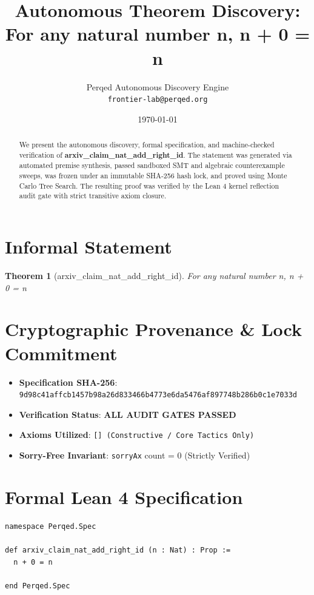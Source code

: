 \documentclass[11pt,a4paper]{article}
\title{\textbf{Autonomous Theorem Discovery: For any natural number n, n + 0 = n}}
\author{Perqed Autonomous Discovery Engine \\ \texttt{frontier-lab@perqed.org}}
\date{\today}
\newtheorem{theorem}{Theorem}
\begin{document}
\maketitle

\begin{abstract}
We present the autonomous discovery, formal specification, and machine-checked verification of \textbf{arxiv_claim_nat_add_right_id}. The statement was generated via automated premise synthesis, passed sandboxed SMT and algebraic counterexample sweeps, was frozen under an immutable SHA-256 hash lock, and proved using Monte Carlo Tree Search. The resulting proof was verified by the Lean 4 kernel reflection audit gate with strict transitive axiom closure.
\end{abstract}

\section{Informal Statement}
\begin{theorem}[arxiv_claim_nat_add_right_id]
For any natural number n, n + 0 = n
\end{theorem}

\section{Cryptographic Provenance \& Lock Commitment}
\begin{itemize}
  \item \textbf{Specification SHA-256}: \texttt{9d98c41affcb1457b98a26d833466b4773e6da5476af897748b286b0c1e7033d}
  \item \textbf{Verification Status}: \textbf{ALL AUDIT GATES PASSED}
  \item \textbf{Axioms Utilized}: \texttt{[] (Constructive / Core Tactics Only)}
  \item \textbf{Sorry-Free Invariant}: \texttt{sorryAx} count = 0 (Strictly Verified)
\end{itemize}

\section{Formal Lean 4 Specification}
\begin{lstlisting}[language=Lean]
namespace Perqed.Spec

def arxiv_claim_nat_add_right_id (n : Nat) : Prop :=
  n + 0 = n

end Perqed.Spec
\end{lstlisting}
\end{document}

